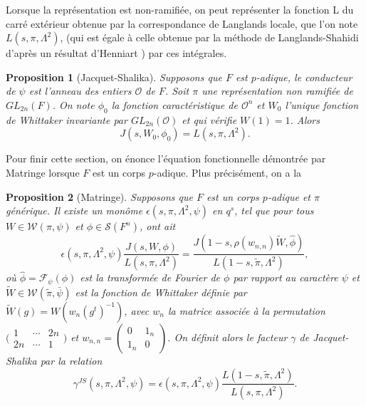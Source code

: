 \documentclass{amsart}
\newtheorem{proposition}{Proposition}[section]
\begin{document}
  Lorsque la représentation est non-ramifiée, on peut représenter la fonction L du carré extérieur obtenue par la correspondance de Langlands locale, que l'on note $L(s, \pi, \Lambda^2)$, (qui est égale à celle obtenue par la méthode de Langlands-Shahidi d'après un résultat d'Henniart \cite{henniart}) par ces intégrales.
  \begin{proposition}[Jacquet-Shalika]
  \label{calculnr}
  Supposons que $F$ est $p$-adique, le conducteur de $\psi$ est l'anneau des entiers $\mathcal{O}$ de $F$. Soit $\pi$ une représentation non ramifiée de $GL_{2n}(F)$. On note $\phi_0$ la fonction caractéristique de $\mathcal{O}^n$ et $W_0$ l'unique fonction de Whittaker invariante par $GL_{2n}(\mathcal{O})$ et qui vérifie $W(1)=1$. Alors
   \begin{equation}
   J(s,W_0,\phi_0) = L(s, \pi, \Lambda^2).
    \end{equation}
  \end{proposition}
  
  Pour finir cette section, on énonce l'équation fonctionnelle démontrée par Matringe lorsque $F$ est un corps $p$-adique. Plus précisément, on a la
 \begin{proposition}[Matringe]
 \label{funcloc}
 Supposons que $F$ est un corps $p$-adique et $\pi$ générique. Il existe un monôme $\epsilon(s,\pi,\Lambda^2,\psi)$ en $q^s$, tel que pour tous $W \in \mathcal{W}(\pi,\psi)$ et $\phi \in \mathcal{S}(F^n)$, ont ait
 \begin{equation}
 \epsilon(s, \pi, \Lambda^2, \psi) \frac{J(s,W,\phi)}{L(s,\pi,\Lambda^2)}  = \frac{J(1-s,\rho(w_{n,n})\tilde{W},\hat{\phi})}{L(1-s,\tilde{\pi},\Lambda^2)},
 \end{equation}
 où $\hat{\phi} = \mathcal{F}_\psi(\phi)$ est la transformée de Fourier de $\phi$ par rapport au caractère $\psi$ et $\tilde{W} \in \mathcal{W}(\tilde{\pi}, \bar{\psi})$ est la fonction de Whittaker définie par $\tilde{W}(g) = W(w_n(g^t)^{-1})$, avec $w_n$ la matrice associée à la permutation $\bigl(\begin{smallmatrix}
    1 & \cdots & 2n  \\
    2n & \cdots &  1 
  \end{smallmatrix}\bigr)$
  et
 $w_{n,n} = \begin{pmatrix}
0 & 1_n \\
1_n & 0
\end{pmatrix}$. On définit alors le facteur $\gamma$ de Jacquet-Shalika par la relation
\begin{equation}
\gamma^{JS}(s,\pi,\Lambda^2,\psi)  = \epsilon(s,\pi,\Lambda^2,\psi)\frac{L(1-s,\tilde{\pi},\Lambda^2)}{L(s,\pi,\Lambda^2)}.
\end{equation}
 \end{proposition}
 
\end{document}
